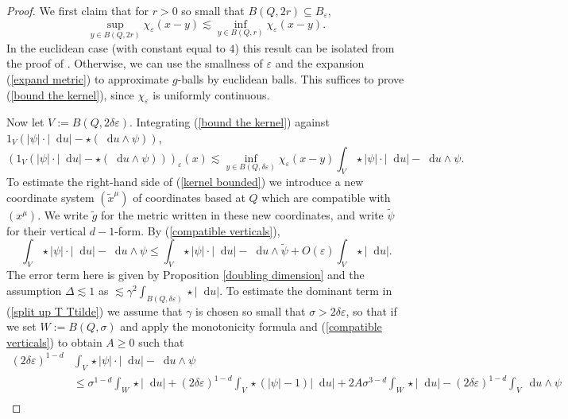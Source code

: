 \documentclass[reqno,10pt]{amsart}
\newcommand*\dif{\mathop{}\!\mathrm{d}}
\theoremstyle{definition}
\numberwithin{equation}{section}
\begin{document}
\begin{proof}
We first claim that for $r > 0$ so small that $B(Q, 2r) \subseteq B_\varepsilon$,
\begin{equation}\label{bound the kernel}
\sup_{y \in B(Q, 2r)} \chi_\varepsilon(x - y) \lesssim \inf_{y \in B(Q, r)} \chi_\varepsilon(x - y).
\end{equation}
In the euclidean case (with constant equal to $4$) this result can be isolated from the proof of \cite[Theorem 7.3]{Giusti77}.
Otherwise, we can use the smallness of $\varepsilon$ and the expansion (\ref{expand metric}) to approximate $g$-balls by euclidean balls.
This suffices to prove (\ref{bound the kernel}), since $\chi_\varepsilon$ is uniformly continuous.

Now let $V := B(Q, 2\delta\varepsilon)$.
Integrating (\ref{bound the kernel}) against $1_V(|\psi| \cdot |\dif u| - \star(\dif u \wedge \psi))$,
\begin{equation}\label{kernel bounded}
(1_V(|\psi| \cdot |\dif u| - \star(\dif u \wedge \psi)))_\varepsilon(x) \lesssim \inf_{y \in B(Q, \delta\varepsilon)} \chi_\varepsilon(x - y) \int_V \star |\psi| \cdot |\dif u| - \dif u \wedge \psi.
\end{equation}
To estimate the right-hand side of (\ref{kernel bounded}) we introduce a new coordinate system $(\tilde x^\mu)$ of coordinates based at $Q$ which are compatible with $(x^\mu)$.
We write $\tilde g$ for the metric written in these new coordinates, and write $\tilde \psi$ for their vertical $d-1$-form.
By (\ref{compatible verticals}),
\begin{equation}\label{split up T Ttilde}
\int_V \star |\psi| \cdot |\dif u| - \dif u \wedge \psi \leq \int_V \star |\psi| \cdot |\dif u| - \dif u \wedge \tilde \psi + O(\varepsilon) \int_V \star |\dif u|.
\end{equation}
The error term here is given by Proposition \ref{doubling dimension} and the assumption $\Delta \lesssim 1$ as $\lesssim \gamma^2 \int_{B(Q, \delta\varepsilon)} \star |\dif u|$.
To estimate the dominant term in (\ref{split up T Ttilde}) we assume that $\gamma$ is chosen so small that $\sigma > 2\delta\varepsilon$, so that if we set $W := B(Q, \sigma)$ and apply the monotonicity formula and (\ref{compatible verticals}) to obtain $A \geq 0$ such that
\begin{align*}
(2\delta\varepsilon)^{1 - d} &\int_V \star |\psi| \cdot |\dif u| - \dif u \wedge \psi \\
&\leq \sigma^{1 - d}\int_W \star |\dif u| + (2\delta\varepsilon)^{1 - d} \int_V \star(|\psi| - 1)|\dif u| + 2A\sigma^{3 - d} \int_W \star |\dif u| - (2\delta\varepsilon)^{1 - d}\int_V \dif u \wedge \psi\\

\end{align*}
\end{proof}
\end{document}
